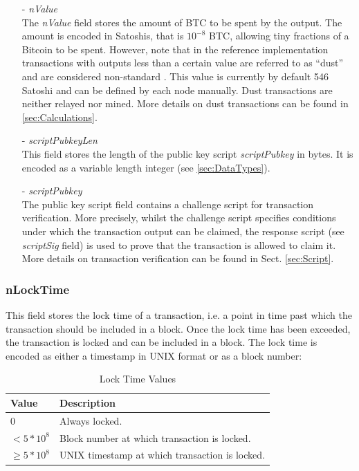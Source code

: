 \begin{itemize}
\item[-] \textit{nValue}~\\
The \textit{nValue} field stores the amount of BTC to be spent by the output. The amount is encoded in Satoshis, that is $10^{-8}$ BTC, allowing tiny fractions of a Bitcoin to be spent. However, note that in the reference implementation transactions with outputs less than a certain value are referred to as ``dust'' and are considered non-standard \cite{DustTransactions}. This value is currently by default 546 Satoshi and can be defined by each node manually. Dust transactions are neither relayed nor mined. More details on dust transactions can be found in \ref{sec:Calculations}.

\item[-] \textit{scriptPubkeyLen}~\\
This field stores the length of the public key script \textit{scriptPubkey} in bytes. It is encoded as a variable length integer (see \ref{sec:DataTypes}).

\item[-] \textit{scriptPubkey}~\\
The public key script field contains a challenge script for transaction verification. More precisely, whilst the challenge script specifies conditions under which the transaction output can be claimed, the response script (see \textit{scriptSig} field) is used to prove that the transaction is allowed to claim it. More details on transaction verification can be found in Sect. \ref{sec:Script}.

\end{itemize}

\subsubsection*{nLockTime}
This field stores the lock time of a transaction, i.e. a point in time past which the transaction should be included in a block. Once the lock time has been exceeded, the transaction is locked and can be included in a block. The lock time is encoded as either a timestamp in UNIX format or as a block number:
\begin{table}
\centering
	\begin{tabularx}{0.7\textwidth } {| >{\centering} m{40pt} | X |}
	\hline
	\textbf{Value} & \textbf{Description} \\ \hline\hline
	$0$ & Always locked. \\ \hline \rule{0pt}{10pt}
	$< 5*10^{8}$ & Block number at which transaction is locked. \\ \hline \rule{0pt}{10pt}
	$\geq 5*10^{8}$ & UNIX timestamp at which transaction is locked. \\ \hline
	\end{tabularx}
	\vspace{5pt}
	\caption{Lock Time Values}
	\label{tab:LockTime}
\end{table}
\vspace{-15pt}

